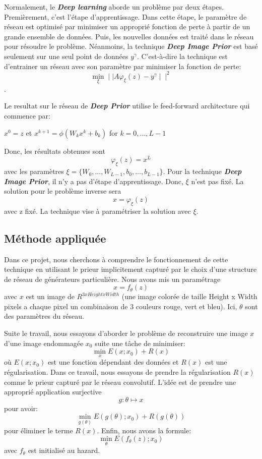 \documentclass[
  11pt,
  dvipsnames]{article}
\begin{document}
Normalement, le \textbf{\emph{Deep learning}} aborde un problème par deux étapes. Premièrement, c'est l'étape d'apprentissage.
Dans cette étape, le paramètre de réseau est optimisé par minimiser un approprié fonction de perte à partir de
un grande ensemble de données. Puis, les nouvelles données est traité dans le réseau pour résoudre le problème.
Néanmoins, la technique \textbf{\emph{Deep Image Prior}} est basé seulement sur une seul point de données \(y^\gamma\). C'est-à-dire
la technique est d'entrainer un réseau avec son paramètre par minimiser la fonction de perte: \[\min_{\xi} \mid\mid A\varphi_\xi(z) - y^\gamma \mid\mid^2\].

Le resultat sur le réseau de \textbf{\emph{Deep Prior}} utilise le feed-forward architecture qui commence par:

\begin{center} $x^0 = z$    et    $x^{k+1} = \phi (W_k x^k + b_k)$ for $k = 0,...,L-1$  \end{center}

Donc, les résultats obtenues sont \[\varphi_\xi(z) = x^L\] avec les paramètres \(\xi = \{W_0,...,W_{L-1},b_0,...,b_{L-1}\}\).
Pour la technique \textbf{\emph{Deep Image Prior}}, il n'y a pas d'étape d'apprentissage. Donc, \(\xi\) n'est pas fixé.
La solution pour le problème inverse sera \[x=\varphi_\xi(z)\] avec z fixé. La technique vise à paramétriser la solution avec \(\xi\).

\hypertarget{muxe9thode-appliquuxe9e}{%
\subsection{Méthode appliquée}\label{muxe9thode-appliquuxe9e}}

Dans ce projet, nous cherchons à comprendre le fonctionnement de cette technique
en utilisant le prieur implicitement capturé par le choix d'une structure de réseau de générateurs particulière.
Nous avons mis un paramétrage \[x = f_\theta(z)\] avec \(x\) est un image de \(R^{3xHeightxWidth}\) (une image colorée de taille
Height x Width pixels a chaque pixel un combinaison de 3 couleurs rouge, vert et bleu).
Ici, \(\theta\) sont des paramètres du réseau.

Suite le travail, nous essayons d'aborder le problème de reconstruire une image \(x\) d'une image endommagée \(x_0\) suite une tâche de minimiser: \[\min_{x} E(x;x_0) + R(x)\] où \(E(x;x_0)\) est une fonction dépendant des données et \(R(x)\) est une régularisation. Dans ce travail, nous essayons de prendre la régularisation \(R(x)\) comme le prieur capturé par le réseau convolutif. L'idée est de prendre une approprié application surjective \[g: \theta \mapsto x\] pour avoir: \[\min_{g(\theta)} E(g(\theta);x_0) + R(g(\theta))\] pour éliminer le terme \(R(x)\). Enfin, nous avons la formule: \[\min_{\theta} E(f_{\theta}(z);x_0)\] avec \(f_{\theta}\) est initialisé au hazard.
\end{document}
